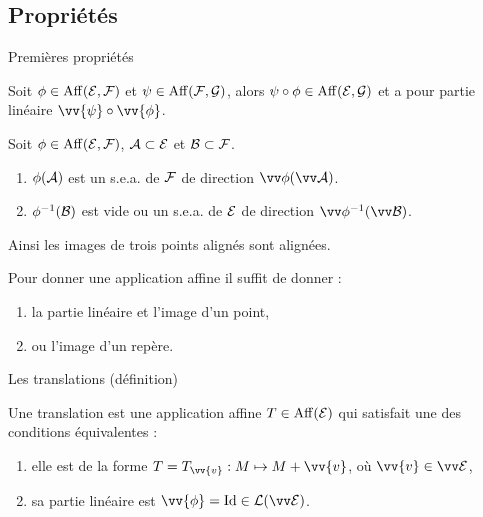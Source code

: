 \documentclass[bigger]{m53beamer}
\begin{document}
\subsection{Propriétés}
  \begin{frame}{Premières propriétés}
    \begin{proposition}
      Soit $\phi\in\operatorname{Aff}(\mathcal{E},\mathcal{F})$ et $\psi\in\operatorname{Aff}(\mathcal{F},\mathcal{G})$, alors $\psi\circ\phi\in\operatorname{Aff}(\mathcal{E},\mathcal{G})$ et a pour partie linéaire $\vv{\psi}\circ\vv{\phi}$.
    \end{proposition}\pause
    \begin{proposition}
      Soit $\phi\in\operatorname{Aff}(\mathcal{E},\mathcal{F})$, $\mathcal{A} \subset \mathcal{E}$ et $\mathcal{B} \subset \mathcal{F}$.
      \begin{enumerate}
        \item $\phi(\mathcal{A})$ est un s.e.a. de $\mathcal{F}$ de direction $\vv\phi(\ev{A})$.
        \item $\phi^{-1}(\mathcal{B})$ est vide ou un s.e.a. de $\mathcal{E}$ de direction $\vv\phi^{-1}(\ev{B})$.
      \end{enumerate}
      Ainsi les images de trois points alignés sont alignées.
    \end{proposition}\pause
    \begin{proposition}
      Pour donner une application affine il suffit de donner :
      \begin{enumerate}[<+(1)->]
        \item la partie linéaire et l'image d'un point,
        \item ou l'image d'un repère.
      \end{enumerate}
    \end{proposition}
  \end{frame}
  \begin{frame}{Les translations (définition)}
    \begin{defprop}
      Une \alert{translation} est  une application affine $T \in \operatorname{Aff}(\mathcal{E})$ qui satisfait une des conditions équivalentes :
      \begin{enumerate}[<+(1)->]
        \item elle est de la forme $T=T_{\vv{v}}:M \mapsto M+\vv{v}$, où $\vv{v} \in \ev{E}$,
        \item sa partie linéaire est $\vv{\phi}=\id \in \lin(\ev{E})$.
      \end{enumerate}
    \end{defprop}
  \end{frame}
\end{document}
